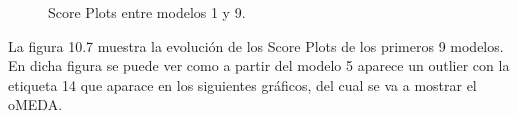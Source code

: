\begin{figure}
\caption{Score Plots entre modelos 1 y 9.}
\end{figure}

\bigskip

La figura 10.7 muestra la evolución de los Score Plots de los primeros 9 modelos. En dicha figura se puede ver como a partir del modelo 5 aparece un outlier con la etiqueta 14 que aparace en los siguientes gráficos, del cual se va a mostrar el oMEDA.


